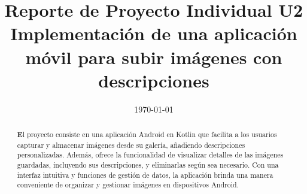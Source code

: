 \documentclass[conference]{IEEEtran}
\date{\specialdate\today}
\begin{document}
%
%
%

\newcommand{\breite}{0.9} %
\newcommand{\RelacionFiguradoscolumnas}{0.9}
\newcommand{\RelacionFiguradoscolumnasPuntoCinco}{0.45}




\title{Reporte de Proyecto Individual U2 \\ Implementación de una aplicación móvil para subir imágenes con descripciones}

\author{
}



\maketitle

\begin{abstract} 
\textbf
El proyecto consiste en una aplicación Android en Kotlin que facilita a los usuarios capturar y almacenar imágenes desde su galería, añadiendo descripciones personalizadas. Además, ofrece la funcionalidad de visualizar detalles de las imágenes guardadas, incluyendo sus descripciones, y eliminarlas según sea necesario. Con una interfaz intuitiva y funciones de gestión de datos, la aplicación brinda una manera conveniente de organizar y gestionar imágenes en dispositivos Android.
\end{abstract}


\end{document}
